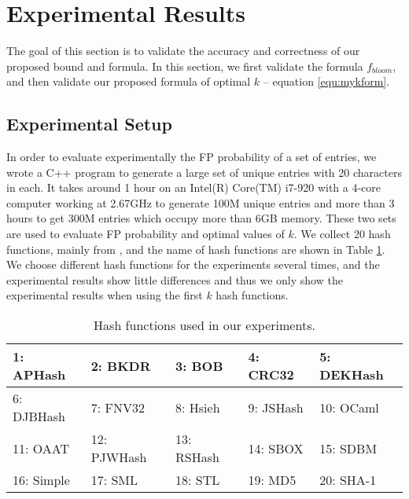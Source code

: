 \presec
\section{Experimental Results} \postsec
\label{sec:evaluation}

The goal of this section is to validate the accuracy and correctness of our proposed bound and formula.
In this section, we first validate the formula $f_{bloom}$, and then validate our proposed formula of optimal $k$ -- equation \ref{equ:mykform}.

\presub
\subsection{Experimental Setup} \postsub
In order to evaluate experimentally the FP probability of a set of entries, we wrote a C++ program to generate a large set of unique entries with 20 characters in each. 
%
It takes around 1 hour on an Intel(R) Core(TM) i7-920 with a 4-core computer working at 2.67GHz to generate 100M unique entries and more than 3 hours to get 300M entries which occupy more than 6GB memory. 
%
These two sets are used to evaluate FP probability and optimal values of $k$.
We collect 20 hash functions, mainly from \cite{hashfuncssigcommccr}, and the name of hash functions are shown in Table 
\ref{table:hashfunction}. We choose different hash functions for the experiments several times, and the experimental results show little differences and thus we only show the experimental results when using the first $k$ hash functions.





\begin{table} [htbp]
\vspace{0in}
\caption{Hash functions used in our experiments.}
\centering
\label{table:hashfunction}
\begin{tabular}{| l | l | l | l | l |}
\hline 1: APHash  & 2: BKDR  & 3: BOB  & 4: CRC32 & 5: DEKHash \\
\hline 6: DJBHash & 7: FNV32 & 8: Hsieh & 9: JSHash & 10: OCaml \\
\hline 11: OAAT & 12: PJWHash & 13: RSHash &14: SBOX &15: SDBM \\
\hline 16: Simple &17: SML & 18: STL & 19: MD5 &20: SHA-1 \\
\hline
\end{tabular}
\end{table}





